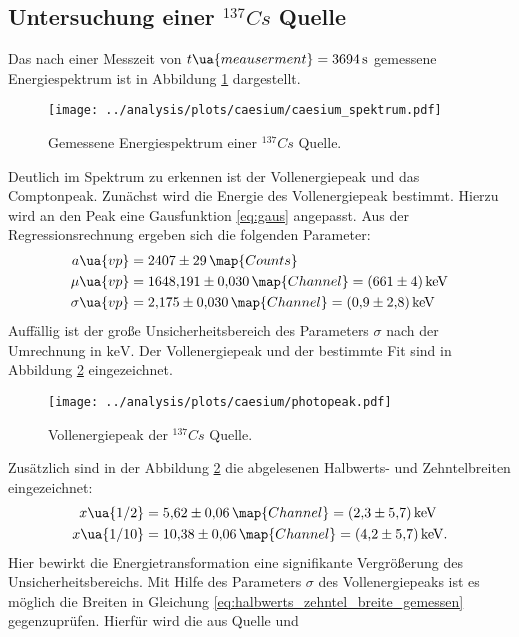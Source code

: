 \subsection{Untersuchung einer $^{137}{Cs}$ Quelle}
\FloatBarrier
Das nach einer Messzeit von $t\ua{meauserment}=\SI{3694}{\second}$ gemessene
Energiespektrum ist in Abbildung \ref{fig:caesium_spektrum} dargestellt.
\begin{figure}
  \centering
  \texttt{[image: ../analysis/plots/caesium/caesium\_spektrum.pdf]}
  \caption{Gemessene Energiespektrum einer $^{137}{Cs}$ Quelle.}
  \label{fig:caesium_spektrum}
\end{figure}
Deutlich im Spektrum zu erkennen ist der Vollenergiepeak und das Comptonpeak.
Zunächst wird die Energie des Vollenergiepeak bestimmt. Hierzu wird an den Peak
eine Gausfunktion \eqref{eq:gaus} angepasst. Aus der Regressionsrechnung ergeben
sich die folgenden Parameter:
\begin{align*}
  a\ua{vp}&=\num{2407\pm29}\,\map{Counts}\\
  \mu\ua{vp}&=\num{1648.191\pm0.030}\,\map{Channel}=\SI{661\pm4}{\kilo\eV} \\ \sigma\ua{vp}&=\num{2.175\pm0.030}\,\map{Channel}=\SI{0.9\pm2.8}{\kilo\eV}
\end{align*}
Auffällig ist der große Unsicherheitsbereich des Parameters $\sigma$ nach der Umrechnung in $\si{\kilo\eV}$.
Der Vollenergiepeak und der bestimmte Fit sind in Abbildung \ref{fig:Vollenergiepeak} eingezeichnet.
\begin{figure}
  \centering
  \texttt{[image: ../analysis/plots/caesium/photopeak.pdf]}
  \caption{Vollenergiepeak der $^{137}{Cs}$ Quelle.}
  \label{fig:Vollenergiepeak}
\end{figure}
Zusätzlich sind in der Abbildung \ref{fig:Vollenergiepeak} die abgelesenen
Halbwerts- und Zehntelbreiten eingezeichnet:
\begin{align}
  \label{eq:halbwerts_zehntel_breite_gemessen}
  x\ua{1/2}&=\num{5.62\pm0.06}\,\map{Channel} = \SI{2.3\pm5.7}{\kilo\eV}\\
  x\ua{1/10}&=\num{10.38\pm0.06}\,\map{Channel} = \SI{4.2\pm5.7}{\kilo\eV}.
\end{align}
Hier bewirkt die Energietransformation eine signifikante Vergrößerung des Unsicherheitsbereichs.
Mit Hilfe des Parameters $\sigma$ des Vollenergiepeaks ist es möglich die
Breiten in Gleichung \eqref{eq:halbwerts_zehntel_breite_gemessen} gegenzuprüfen.
Hierfür wird die aus Quelle \cite{halbwertsbreite} und \cite{anleitungV18}
